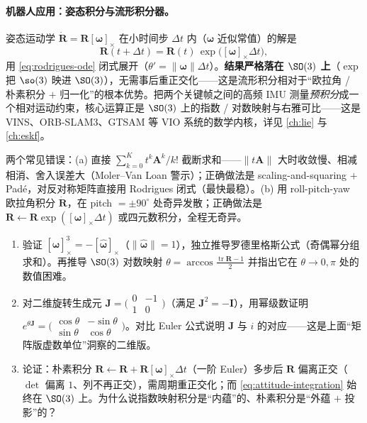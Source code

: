 \paragraph{机器人应用：姿态积分与流形积分器。}
姿态运动学 $\dot{\mathbf{R}}=\mathbf{R}[\boldsymbol{\omega}]_\times$ 在小时间步 $\Delta t$ 内（$\boldsymbol{\omega}$ 近似常值）的解是
\begin{equation}
  \mathbf{R}(t+\Delta t)=\mathbf{R}(t)\,\exp\bigl([\boldsymbol{\omega}]_\times\Delta t\bigr),
  \label{eq:attitude-integration}
\end{equation}
用 \cref{eq:rodrigues-ode} 闭式展开（$\theta'=\|\boldsymbol{\omega}\|\Delta t$）。\textbf{结果严格落在 $\SO(3)$ 上}（$\exp$ 把 $\so(3)$ 映进 $\SO(3)$），无需事后重正交化——这是流形积分相对于“欧拉角 / 朴素积分 $+$ 归一化”的根本优势。把两个关键帧之间的高频 IMU 测量\emph{预积分}成一个相对运动约束，核心运算正是 $\SO(3)$ 上的指数 / 对数映射与右雅可比——这是 VINS、ORB-SLAM3、GTSAM 等 VIO 系统的数学内核，详见 \cref{ch:lie} 与 \cref{ch:eskf}。

\begin{pitfall}
两个常见错误：(a) 直接 $\sum_{k=0}^{K}t^k\mathbf{A}^k/k!$ 截断求和——$\|t\mathbf{A}\|$ 大时收敛慢、相减相消、舍入误差大（Moler--Van Loan 警示）；正确做法是 scaling-and-squaring $+$ Padé，对反对称矩阵直接用 Rodrigues 闭式（最快最稳）。(b) 用 roll-pitch-yaw 欧拉角积分 $\dot{\mathbf{R}}$，在 pitch $=\pm90^\circ$ 处奇异发散；正确做法是 $\mathbf{R}\leftarrow\mathbf{R}\exp([\boldsymbol{\omega}]_\times\Delta t)$ 或四元数积分，全程无奇异。
\end{pitfall}

\begin{practice}
\begin{enumerate}
  \item 验证 $[\hat{\boldsymbol{\omega}}]_\times^3=-[\hat{\boldsymbol{\omega}}]_\times$（$\|\hat{\boldsymbol{\omega}}\|=1$），独立推导罗德里格斯公式（奇偶幂分组求和）。再推导 $\SO(3)$ 对数映射 $\theta=\arccos\frac{\operatorname{tr}\mathbf{R}-1}{2}$ 并指出它在 $\theta\to0,\pi$ 处的数值困难。
  \item 对二维旋转生成元 $\mathbf{J}=\bigl(\begin{smallmatrix}0&-1\\1&0\end{smallmatrix}\bigr)$（满足 $\mathbf{J}^2=-\mathbf{I}$），用幂级数证明 $e^{\theta\mathbf{J}}=\bigl(\begin{smallmatrix}\cos\theta&-\sin\theta\\\sin\theta&\cos\theta\end{smallmatrix}\bigr)$。对比 Euler 公式说明 $\mathbf{J}$ 与 $i$ 的对应——这是上面“矩阵版虚数单位”洞察的二维版。
  \item 论证：朴素积分 $\mathbf{R}\leftarrow\mathbf{R}+\mathbf{R}[\boldsymbol{\omega}]_\times\Delta t$（一阶 Euler）多步后 $\mathbf{R}$ 偏离正交（$\det$ 偏离 $1$、列不再正交），需周期重正交化；而 \cref{eq:attitude-integration} 始终在 $\SO(3)$ 上。为什么说指数映射积分是“内蕴”的、朴素积分是“外蕴 $+$ 投影”的？
\end{enumerate}
\end{practice}

